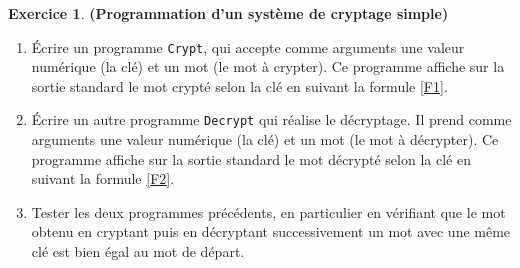 \documentclass[12pt]{article}
\theoremstyle{definition}
\newtheorem{Exercice}{Exercice}
\begin{document}
\begin{Exercice} {\bf (Programmation d'un système de cryptage simple)}
\begin{enumerate}
    \item Écrire un programme {\tt Crypt}, qui accepte comme arguments
    une valeur numérique (la clé) et un mot (le mot à crypter). Ce programme
    affiche sur la sortie standard le mot crypté selon la clé
    en suivant la formule \eqref{F1}.
    \smallskip

    \item Écrire un autre programme {\tt Decrypt} qui réalise le décryptage.
    Il prend comme arguments une valeur numérique (la clé) et un mot
    (le mot à décrypter). Ce programme affiche sur la sortie standard le
    mot décrypté selon la clé en suivant la formule \eqref{F2}.
    \smallskip

    \item Tester les deux programmes précédents, en particulier en vérifiant
    que le mot obtenu en cryptant puis en décryptant successivement
    un mot avec une même clé est bien égal au mot de départ.
\end{enumerate}
\end{Exercice}
\bigskip
\end{document}

